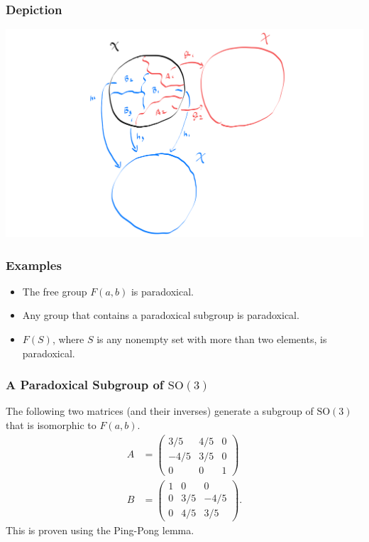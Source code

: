 \documentclass{beamer-custom}
\begin{document}
\begin{frame}
  \frametitle{Depiction}
  \begin{center}
    \includegraphics[scale=0.17]{images/paradoxical_decomposition_2.png}
  \end{center}
\end{frame}
\begin{frame}
  \frametitle{Examples}
  \begin{itemize}
    \item The free group $F(a,b)$ is paradoxical.\pause
    \item Any group that contains a paradoxical subgroup is paradoxical.
    \item $F(S)$, where $S$ is any nonempty set with more than two elements, is paradoxical.
  \end{itemize}
\end{frame}
\begin{frame}
  \frametitle{A Paradoxical Subgroup of $\text{SO}(3)$}
  The following two matrices (and their inverses) generate a subgroup of $\text{SO}(3)$ that is isomorphic to $F(a,b)$.
  \begin{align*}
    A &= \begin{pmatrix}3/5 & 4/5 & 0 \\  -4/5 & 3/5 & 0 \\ 0 & 0 & 1\end{pmatrix}\\
    B &= \begin{pmatrix}1 & 0 & 0 \\ 0 & 3/5 & -4/5 \\ 0 & 4/5 & 3/5\end{pmatrix}.
  \end{align*}\pause
  This is proven using the Ping-Pong lemma.
\end{frame}
\end{document}
